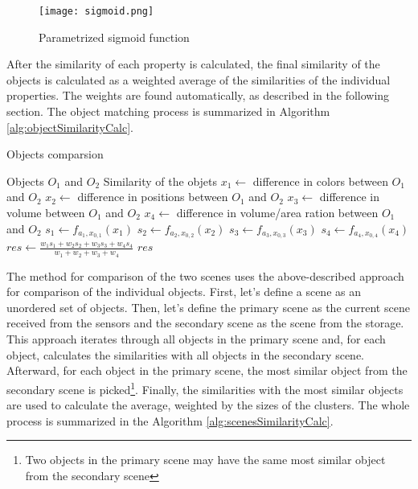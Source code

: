 \begin{figure}[htpb]
    \centering
    \texttt{[image: sigmoid.png]}
    \caption{Parametrized sigmoid function} \label{fig:sigmoid}
\end{figure}

After the similarity of each property is calculated, the final similarity of the objects is calculated as a weighted average of the similarities of the individual properties. The weights are found automatically, as described in the following section. The object matching process is summarized in Algorithm \ref{alg:objectSimilarityCalc}.

\begin{algorithm}
    \caption{Objects comparsion}\label{alg:objectSimilarityCalc}
    \begin{algorithmic}
        \Require Objects $O_1$ and $O_2$
        \Ensure Similarity of the objets
        \State $x_1 \leftarrow $ difference in colors between $O_1$ and $O_2$
        \State $x_2 \leftarrow $ difference in positions between $O_1$ and $O_2$
        \State $x_3 \leftarrow $ difference in volume between $O_1$ and $O_2$
        \State $x_4 \leftarrow $ difference in volume/area ration between $O_1$ and $O_2$
        \State $s_1 \leftarrow f_{a_1,x_{0,1}}(x_1)$
        \State $s_2 \leftarrow f_{a_2,x_{0,2}}(x_2)$
        \State $s_3 \leftarrow f_{a_3,x_{0,3}}(x_3)$
        \State $s_4 \leftarrow f_{a_4,x_{0,4}}(x_4)$
        \State $res \leftarrow\frac{w_1s_1 + w_2s_2 + w_3s_3 + w_4s_4}{w_1+w_2+w_3+w_4}$
        \State\Return $res$
    \end{algorithmic}
\end{algorithm}

The method for comparison of the two scenes uses the above-described approach for comparison of the individual objects. First, let's define a scene as an unordered set of objects. Then, let's define the primary scene as the current scene received from the sensors and the secondary scene as the scene from the storage. This approach iterates through all objects in the primary scene and, for each object, calculates the similarities with all objects in the secondary scene. Afterward, for each object in the primary scene, the most similar object from the secondary scene is picked\footnote{Two objects in the primary scene may have the same most similar object from the secondary scene}. Finally, the similarities with the most similar objects are used to calculate the average, weighted by the sizes of the clusters. The whole process is summarized in the Algorithm \ref{alg:scenesSimilarityCalc}.

